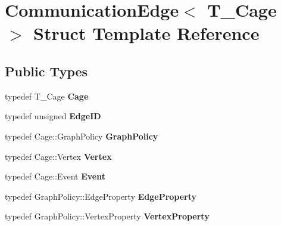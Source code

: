 \hypertarget{structCommunicationEdge}{}\section{Communication\+Edge$<$ T\+\_\+\+Cage $>$ Struct Template Reference}
\label{structCommunicationEdge}
\subsection*{Public Types}
\begin{DoxyCompactItemize}
\item 
\hypertarget{structCommunicationEdge_a8ecc7deb6fda51066a2455beb2ea7d2d}{}typedef T\+\_\+\+Cage {\bfseries Cage}\label{structCommunicationEdge_a8ecc7deb6fda51066a2455beb2ea7d2d}

\item 
\hypertarget{structCommunicationEdge_a99815fbba55f784bf9494e9cf20a1f9e}{}typedef unsigned {\bfseries Edge\+I\+D}\label{structCommunicationEdge_a99815fbba55f784bf9494e9cf20a1f9e}

\item 
\hypertarget{structCommunicationEdge_ab401daa55d9eed482a91a576134d30f4}{}typedef Cage\+::\+Graph\+Policy {\bfseries Graph\+Policy}\label{structCommunicationEdge_ab401daa55d9eed482a91a576134d30f4}

\item 
\hypertarget{structCommunicationEdge_a23c1292fcdd3cee3fe62753743286b1f}{}typedef Cage\+::\+Vertex {\bfseries Vertex}\label{structCommunicationEdge_a23c1292fcdd3cee3fe62753743286b1f}

\item 
\hypertarget{structCommunicationEdge_aca6af3a4d4e7a6958946fb65519012c5}{}typedef Cage\+::\+Event {\bfseries Event}\label{structCommunicationEdge_aca6af3a4d4e7a6958946fb65519012c5}

\item 
\hypertarget{structCommunicationEdge_a3ccce04bfffd7426efff28f69383f9f1}{}typedef Graph\+Policy\+::\+Edge\+Property {\bfseries Edge\+Property}\label{structCommunicationEdge_a3ccce04bfffd7426efff28f69383f9f1}

\item 
\hypertarget{structCommunicationEdge_a7a92048769b54908d5d050a078af7bf4}{}typedef Graph\+Policy\+::\+Vertex\+Property {\bfseries Vertex\+Property}\label{structCommunicationEdge_a7a92048769b54908d5d050a078af7bf4}

\end{DoxyCompactItemize}
